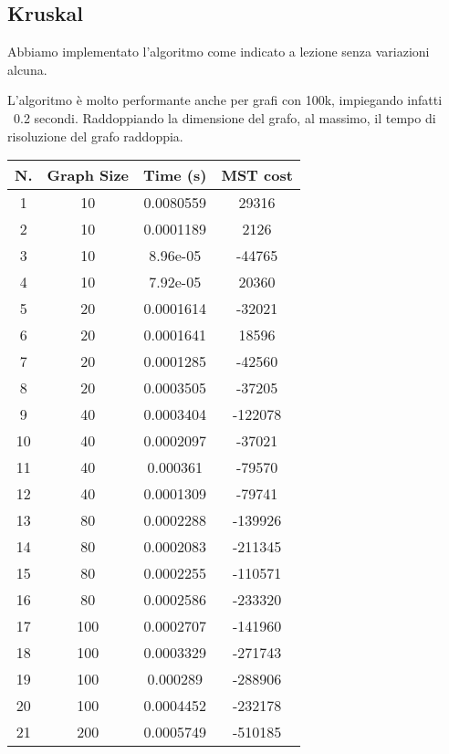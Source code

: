 \subsection{Kruskal}
Abbiamo implementato l'algoritmo come indicato a lezione senza variazioni alcuna.


L'algoritmo è molto performante anche per grafi con 100k, impiegando infatti ~0.2 secondi. Raddoppiando la dimensione del grafo, al massimo, il tempo di risoluzione del grafo raddoppia. 

\begin{table}[H]
	\centering
	\begin{tabular}{|c|c|c|c|}
		\hline
		\textbf{N.} & \textbf{Graph Size} & \textbf{Time (s)} & \textbf{MST cost}\\ 
		\hline
		1 & 10 & 0.0080559 & 29316\\
		\hline
		2 & 10 & 0.0001189 & 2126\\
		\hline
		3 & 10 & 8.96e-05 & -44765\\
		\hline
		4 & 10 & 7.92e-05 & 20360\\
		\hline\hline
		5 & 20 & 0.0001614 & -32021\\
		\hline
		6 & 20 & 0.0001641 & 18596\\
		\hline
		7 & 20 & 0.0001285 & -42560\\
		\hline
		8 & 20 & 0.0003505 & -37205\\
		\hline\hline
		9 & 40 & 0.0003404 & -122078\\
		\hline
		10 & 40 & 0.0002097 & -37021\\
		\hline
		11 & 40 & 0.000361 & -79570\\
		\hline
		12 & 40 & 0.0001309 & -79741\\
		\hline\hline
		13 & 80 & 0.0002288 & -139926\\
		\hline
		14 & 80 & 0.0002083 & -211345\\
		\hline
		15 & 80 & 0.0002255 & -110571\\
		\hline
		16 & 80 & 0.0002586 & -233320\\
		\hline\hline
		17 & 100 & 0.0002707 & -141960\\
		\hline
		18 & 100 & 0.0003329 & -271743\\
		\hline
		19 & 100 & 0.000289 & -288906\\
		\hline
		20 & 100 & 0.0004452 & -232178\\
		\hline\hline
		21 & 200 & 0.0005749 & -510185\\

\end{tabular}
\end{table}
